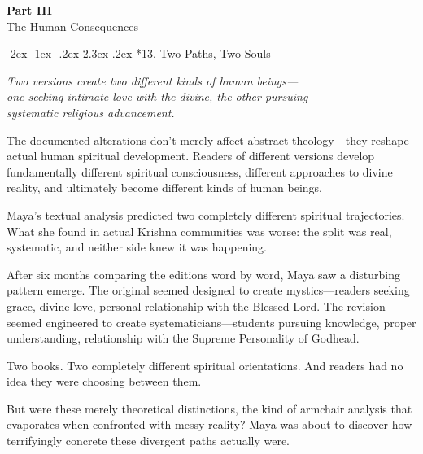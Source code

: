 \documentclass[12pt,twoside]{book}
\makeatletter
\def\cleardoublepage{\clearpage\if@twoside \ifodd\c@page\else\hbox{}\thispagestyle{empty}\newpage\if@twocolumn\hbox{}\newpage\fi\fi\fi}
\renewcommand\section{\@startsection{section}{1}{\z@}%
{-2ex \@plus -1ex \@minus -.2ex}%
{2.3ex \@plus.2ex}%
{\normalfont\Large\bfseries}}
\makeatother
\begin{document}
\cleardoublepage
\clearpage
\pagestyle{empty}
\vspace*{0.20\textheight}
\begin{center}
{\Huge\bfseries Part III}\\[0.5cm]
{\Large The Human Consequences}
\end{center}
\vspace*{\fill}
\cleardoublepage
\pagestyle{fancy}
\vspace*{0.20\textheight}
\section*{13. Two Paths, Two Souls}
\thispagestyle{chapterpage}

{\centering\itshape Two versions create two different kinds of human beings—\\one seeking intimate love with the divine, the other pursuing\\systematic religious advancement.\par}
\vspace{0.3cm}

\normalfont\justifying
The documented alterations don't merely affect abstract theology—they reshape actual human spiritual development. Readers of different versions develop fundamentally different spiritual consciousness, different approaches to divine reality, and ultimately become different kinds of human beings.

Maya's textual analysis predicted two completely different spiritual trajectories. What she found in actual Krishna communities was worse: the split was real, systematic, and neither side knew it was happening.

After six months comparing the editions word by word, Maya saw a disturbing pattern emerge. The original seemed designed to create mystics—readers seeking grace, divine love, personal relationship with the Blessed Lord. The revision seemed engineered to create systematicians—students pursuing knowledge, proper understanding, relationship with the Supreme Personality of Godhead.

Two books. Two completely different spiritual orientations. And readers had no idea they were choosing between them.

But were these merely theoretical distinctions, the kind of armchair analysis that evaporates when confronted with messy reality? Maya was about to discover how terrifyingly concrete these divergent paths actually were.
\end{document}

